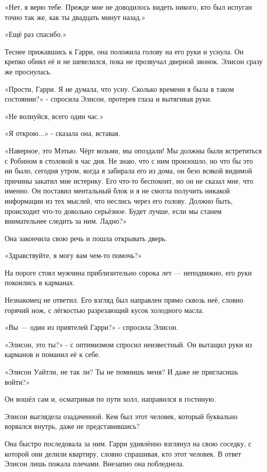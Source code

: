 \documentclass[a5paper, 9pt,
final, openany, twoside=true]{memoir}
\begin{document}
«Нет, я верю тебе. Прежде мне не доводилось видеть никого, кто был испуган точно так же, как ты двадцать минут назад.»

«Ещё раз спасибо.»

Теснее прижавшись к Гарри, она положила голову на его руки и уснула. Он крепко обнял её и не шевелился, пока не прозвучал дверной звонок. Элисон сразу же проснулась.

«Прости, Гарри. Я не думала, что усну. Сколько времени я была в таком состоянии?» - спросила Элисон, протерев глаза и вытягивая руки.

«Не волнуйся, всего один час.»

«Я открою...» - сказала она, вставая.

«Наверное, это Мэтью. Чёрт возьми, мы опоздали! Мы должны были встретиться с Робином в столовой в час дня. Не знаю, что с ним произошло, но что бы это ни было, сегодня утром, когда я забирала его из дома, он безо всякой видимой причины закатил мне истерику. Его что-то беспокоит, но он не сказал мне, что именно. Он поставил ментальный блок и я не смогла получить никакой информации из тех мыслей, что неслись через его голову. Должно быть, происходит что-то довольно серьёзное. Будет лучше, если мы станем внимательнее следить за ним. Ладно?»

Она закончила свою речь и пошла открывать дверь.\bigskip

«Здравствуйте, я могу вам чем-то помочь?»

На пороге стоял мужчина приблизительно сорока лет — неподвижно, его руки покоились в карманах.

Незнакомец не ответил. Его взгляд был направлен прямо сквозь неё, словно горячий нож, с лёгкостью разрезающий кусок холодного масла.

«Вы — один из приятелей Гарри?» - спросила Элисон.

«Элисон, это ты?» - с оптимизмом спросил неизвестный. Он вытащил руки из карманов и поманил её к себе.

«Элисон Уайтли, не так ли? Ты не помнишь меня? И даже не пригласишь войти?»

Он вошёл сам и, осматривая по пути холл, направился в гостиную.

Элисон выглядела озадаченной. Кем был этот человек, который буквально ворвался внутрь, даже не представившись?

Она быстро последовала за ним. Гарри удивлённо взглянул на свою соседку, с которой они делили квартиру, словно спрашивая, кто этот человек. В ответ Элисон лишь пожала плечами. Внезапно она побледнела.
\end{document}
